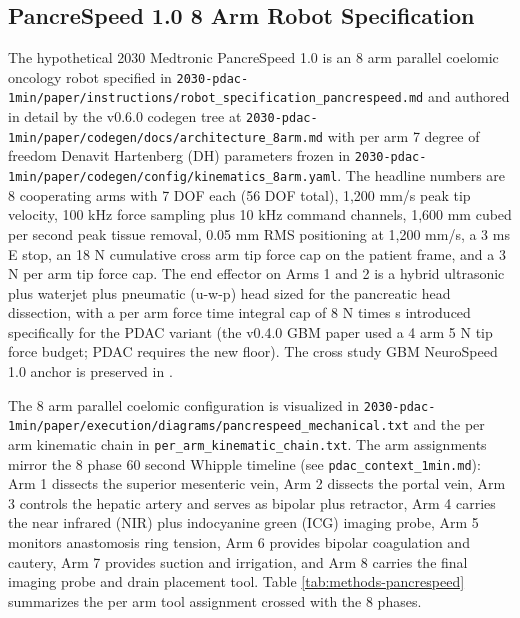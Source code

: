 
\subsection{PancreSpeed 1.0 8 Arm Robot Specification}
\label{sec:methods-robot}

The hypothetical 2030 Medtronic PancreSpeed 1.0 is an 8 arm
parallel coelomic oncology robot specified in
\texttt{2030-pdac-1min/paper/instructions/robot_specification_pancrespeed.md}
and authored in detail by the v0.6.0 codegen tree at
\texttt{2030-pdac-1min/paper/codegen/docs/architecture_8arm.md}
with per arm 7 degree of freedom Denavit Hartenberg (DH) parameters
frozen in
\texttt{2030-pdac-1min/paper/codegen/config/kinematics_8arm.yaml}.
The headline numbers are 8 cooperating arms with 7 DOF each (56
DOF total), 1,200 mm/s peak tip velocity, 100 kHz force sampling
plus 10 kHz command channels, 1,600 mm cubed per second peak
tissue removal, 0.05 mm RMS positioning at 1,200 mm/s, a 3 ms E
stop, an 18 N cumulative cross arm tip force cap on the patient
frame, and a 3 N per arm tip force cap. The end effector on Arms 1
and 2 is a hybrid ultrasonic plus waterjet plus pneumatic
(u-w-p) head sized for the pancreatic head dissection, with a per
arm force time integral cap of 8 N times s introduced specifically
for the PDAC variant (the v0.4.0 GBM paper used a 4 arm 5 N tip
force budget; PDAC requires the new floor). The cross study GBM
NeuroSpeed 1.0 anchor is preserved in
\cite{kawchak_2026_20113157}.

The 8 arm parallel coelomic configuration is visualized in
\texttt{2030-pdac-1min/paper/execution/diagrams/pancrespeed_mechanical.txt}
and the per arm kinematic chain in
\texttt{per_arm_kinematic_chain.txt}. The arm assignments mirror
the 8 phase 60 second Whipple timeline (see
\texttt{pdac_context_1min.md}): Arm 1 dissects the superior
mesenteric vein, Arm 2 dissects the portal vein, Arm 3 controls
the hepatic artery and serves as bipolar plus retractor, Arm 4
carries the near infrared (NIR) plus indocyanine green (ICG)
imaging probe, Arm 5 monitors anastomosis ring tension, Arm 6
provides bipolar coagulation and cautery, Arm 7 provides suction
and irrigation, and Arm 8 carries the final imaging probe and
drain placement tool. Table \ref{tab:methods-pancrespeed}
summarizes the per arm tool assignment crossed with the 8 phases.

